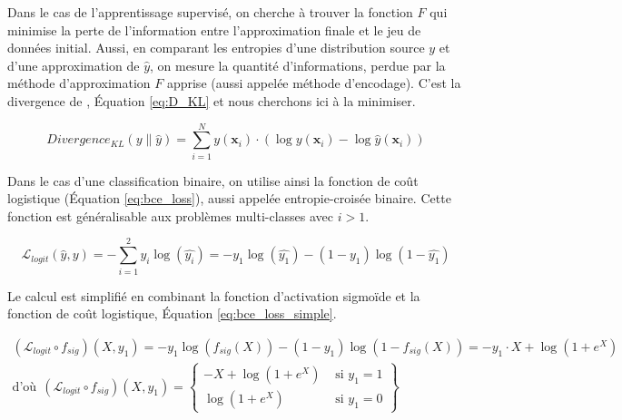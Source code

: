 Dans le cas de l'apprentissage supervisé, on cherche à trouver la fonction $F$ qui minimise la perte de l'information entre l'approximation finale et le jeu de données initial.
Aussi, en comparant les entropies d'une distribution source $y$ et d'une approximation de $\hat{y}$, on mesure la quantité d'informations, perdue par la méthode d'approximation $F$ apprise (aussi appelée méthode d'encodage).
C'est la divergence de \citeauthor{kullback_information_1951} \cite{kullback_information_1951}, Équation \ref{eq:D_KL} et nous cherchons ici à la minimiser.

\begin{equation} \label{eq:D_KL}
Divergence_{K L}(y \| \hat{y})=\sum_{i=1}^{N} y\left(\mathbf{x}_{i}\right) \cdot\left(\log y\left(\mathbf{x}_{i}\right)-\log \hat{y}\left(\mathbf{x}_{i}\right)\right)
\end{equation}

Dans le cas d'une classification binaire, on utilise ainsi la fonction de coût logistique (Équation \ref{eq:bce_loss}), aussi appelée entropie-croisée binaire. Cette fonction est généralisable aux problèmes multi-classes avec $i > 1$.

\begin{equation} \label{eq:bce_loss}
\mathcal{L}_{logit}\left(\hat{y}, y\right) = -\sum^{2}_{i=1} y_{i} \log \left(\hat{y_{i}}\right) = - y_{1} \log \left(\hat{y_{1}}\right) -\left(1-y_{1}\right) \log \left(1-\hat{y_{1}}\right)
\end{equation}

Le calcul est simplifié en combinant la fonction d'activation sigmoïde et la fonction de coût logistique, Équation \ref{eq:bce_loss_simple}.

\begin{equation} \label{eq:bce_loss_simple}
\begin{split}
\left(\mathcal{L}_{logit} \circ f_{sig}\right)\left(X, y_{1}\right) = - y_{1} \log \left(f_{sig}(X)\right) -\left(1-y_{1}\right) \log \left(1-f_{sig}(X)\right) = -y_1 \cdot X +\log \left(1+e^{X}\right)
\\
\text{d'où} \ \ \left(\mathcal{L}_{logit} \circ f_{sig}\right)\left(X, y_{1}\right) = \left\{\begin{array}{cc}{- X +\log \left(1+e^{X}\right)} & {\text { si } y_{1}=1} \\ {\log \left(1+e^{X}\right)} & {\text { si } y_{1}=0}\end{array}\right\}
\end{split}
\end{equation}

